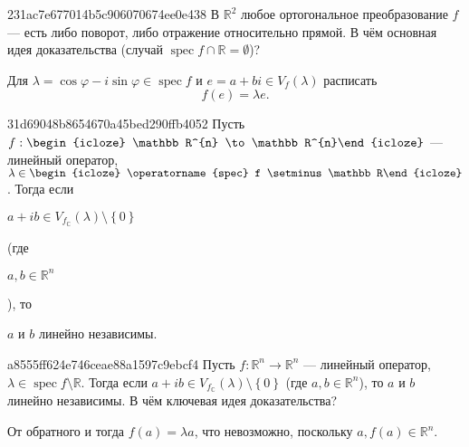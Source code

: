 \begin{note}{231ac7e677014b5c906070674ee0e438}
    В \({ \mathbb R^2 }\) любое ортогональное преобразование \({ f }\) --- есть либо поворот, либо отражение относительно прямой.
    В чём основная идея доказательства (случай \({ \operatorname{spec} f \cap \mathbb R = \emptyset }\))?

    \begin{cloze}{1}
        Для \({ \lambda = \cos \varphi - i \sin \varphi \in \operatorname{spec} f }\) и \({ e = a + bi \in V_f(\lambda) }\) расписать
        \[
            f(e) = \lambda e.
        \]
    \end{cloze}
\end{note}

\begin{note}{31d69048b8654670a45bed290ffb4052}
    Пусть \({ f : \begin{icloze}{4}\mathbb R^{n} \to \mathbb R^{n}\end{icloze} }\) --- линейный оператор,\: \({ \lambda \in \begin{icloze}{5}\operatorname{spec} f \setminus \mathbb R\end{icloze} }\).
    Тогда если \begin{icloze}{2}\({ a + ib \in V_{f_{\mathbb C}}(\lambda) \setminus \left\{ 0 \right\} }\)\end{icloze} (где \begin{icloze}{3}\({ a, b \in \mathbb R^{n} }\)\end{icloze}), то \begin{icloze}{1}\({ a }\) и \({ b }\) линейно независимы.\end{icloze}
\end{note}

\begin{note}{a8555ff624e746ceae88a1597c9ebcf4}
    Пусть \({ f : \mathbb R^{n} \to \mathbb R^{n} }\) --- линейный оператор,\: \({ \lambda \in \operatorname{spec} f \setminus \mathbb R }\).
    Тогда если \({ a + ib \in V_{f_{\mathbb C}}(\lambda) \setminus \left\{ 0 \right\} }\) (где \({ a, b \in \mathbb R^{n} }\)), то \({ a }\) и \({ b }\) линейно независимы.
    В чём ключевая идея доказательства?

    \begin{cloze}{1}
        От обратного и тогда \({ f(a) = \lambda a }\), что невозможно, поскольку \({ a, f(a) \in \mathbb R^{n} }\).
    \end{cloze}
\end{note}

